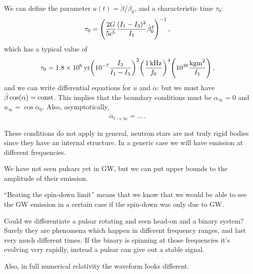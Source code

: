 \documentclass[main.tex]{subfiles}
\begin{document}

We can define the parameter \(u(t) = \dot{\beta} / \dot{\beta}_{0}\), and a characteristic time \(\tau_0 \): 
%
\begin{align}
\tau_0  = \qty( \frac{2G}{5 c^{5}} \frac{(I_1 - I_3 )^2}{I_1  } \dot{\beta}_{0}^{4})^{-1}
\,,
\end{align}
%
which has a typical value of 
%
\begin{align}
\tau_0 = \SI{1.8e6}{yr} \qty(\num{e-7} \frac{I_3 }{I_1 - I_3 })^2 \qty( \frac{ \SI{1}{kHz}}{f_0 })^{4} \qty(\num{e38} \frac{\SI{}{kg m^2}}{I_1 })
\,,
\end{align}
%
and we can write differential equations for \(\dot{u}\) and \(\dot{\alpha}\): but we must have \(\dot{\beta} \cos(\alpha ) = \text{const}\). 
This implies that the boundary conditions must be \(\alpha_{ \infty } = 0\) and \(u_{ \infty } = \cos \alpha_0 \). Also, asymptotically, 
%
\begin{align}
\dot{\alpha}_{t \to \infty } = \dots
\,.
\end{align}

These conditions do not apply in general, neutron stars are not truly rigid bodies since they have an internal structure. 
In a generic case we will have emission at different frequencies. 

We have not seen pulsars yet in GW, but we can put upper bounds to the amplitude of their emission. 

``Beating the spin-down limit'' means that we know that we would be able to see the GW emission in a certain case if the spin-down was only due to GW.

Could we differentiate a pulsar rotating and seen head-on and a binary system? 
Surely they are phenomena which happen in different frequency ranges, and last very much different times. 
If the binary is spinning at those frequencies it's evolving very rapidly, instead a pulsar can give out a stable signal. 

Also, in full numerical relativity the waveform looks different. 
\end{document}

